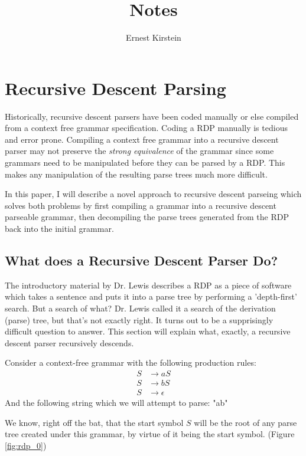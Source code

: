 \documentclass[11pt]{article}
\begin{document}
\title{Notes}
\author{Ernest Kirstein}
\maketitle

\section{Recursive Descent Parsing}
\label{rdp}
Historically, recursive descent parsers have been coded manually or else compiled from 
a context free grammar specification. \cite{compiler} 
Coding a RDP manually is tedious and error prone.
Compiling a context free grammar into a recursive descent parser
may not preserve the {\em strong equivalence} of the grammar
since some grammars need to be manipulated before
they can be parsed by a RDP. This makes any manipulation of the
resulting parse trees much more difficult. 

In this paper, I will describe a novel approach to recursive descent parseing
which solves both problems by first compiling a grammar into a recursive descent
parseable grammar, then decompiling the parse trees generated from the RDP back into
the initial grammar.


\subsection{What does a Recursive Descent Parser Do?}
The introductory material by Dr. Lewis \cite{lewis} describes a RDP as a piece of software which takes 
a sentence and puts it into a parse tree by performing a 'depth-first' search. 
But a search of what? Dr. Lewis called it a search of the derivation (parse) tree, but that's not exactly right.
It turns out to be a supprisingly difficult question to answer. 
This section will explain what, exactly, a recursive descent parser recursively descends. 

Consider a context-free grammar with the following production rules:
\setcounter{equation}{0}
\begin{align}
S &\rightarrow a S\\
S &\rightarrow b S\\
S &\rightarrow \epsilon
\end{align}
And the following string which we will attempt to parse: "ab"

We know, right off the bat, that the start symbol $S$ will be the root of any parse tree created under this
grammar, by virtue of it being the start symbol. (Figure \ref{fig:rdp_0})
\end{document}

